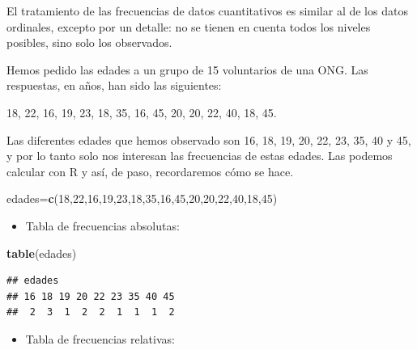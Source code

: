 \documentclass[]{book}
\newenvironment{Shaded}{\begin{snugshade}}{\end{snugshade}}
\newcommand{\DecValTok}[1]{\textcolor[rgb]{0.00,0.00,0.81}{#1}}
\newcommand{\KeywordTok}[1]{\textcolor[rgb]{0.13,0.29,0.53}{\textbf{#1}}}
\newcommand{\NormalTok}[1]{#1}
\providecommand{\tightlist}{%
  \setlength{\itemsep}{0pt}\setlength{\parskip}{0pt}}
\theoremstyle{definition}
\theoremstyle{definition}
\theoremstyle{definition}
\theoremstyle{remark}
\let\BeginKnitrBlock\begin \let\EndKnitrBlock\end
\begin{document}
El tratamiento de las frecuencias de datos cuantitativos es similar al de los datos ordinales, excepto por un detalle: no se tienen en cuenta todos los niveles posibles, sino solo los observados.

\BeginKnitrBlock{example}
\protect\hypertarget{exm:ex181}{}{\label{exm:ex181} }Hemos pedido las edades a un grupo de 15 voluntarios de una ONG. Las respuestas, en años, han sido las siguientes:
\EndKnitrBlock{example}

18, 22, 16, 19, 23, 18, 35, 16, 45, 20, 20, 22, 40, 18, 45.

Las diferentes edades que hemos observado son 16, 18, 19, 20, 22, 23, 35, 40 y 45, y por lo tanto solo nos interesan las frecuencias de estas edades. Las podemos calcular con R y así, de paso, recordaremos cómo se hace.

\begin{Shaded}
\begin{Highlighting}[]
\NormalTok{edades=}\KeywordTok{c}\NormalTok{(}\DecValTok{18}\NormalTok{,}\DecValTok{22}\NormalTok{,}\DecValTok{16}\NormalTok{,}\DecValTok{19}\NormalTok{,}\DecValTok{23}\NormalTok{,}\DecValTok{18}\NormalTok{,}\DecValTok{35}\NormalTok{,}\DecValTok{16}\NormalTok{,}\DecValTok{45}\NormalTok{,}\DecValTok{20}\NormalTok{,}\DecValTok{20}\NormalTok{,}\DecValTok{22}\NormalTok{,}\DecValTok{40}\NormalTok{,}\DecValTok{18}\NormalTok{,}\DecValTok{45}\NormalTok{)}
\end{Highlighting}
\end{Shaded}

\begin{itemize}
\tightlist
\item
  Tabla de frecuencias absolutas:
\end{itemize}

\begin{Shaded}
\begin{Highlighting}[]
\KeywordTok{table}\NormalTok{(edades)    }
\end{Highlighting}
\end{Shaded}

\begin{verbatim}
## edades
## 16 18 19 20 22 23 35 40 45 
##  2  3  1  2  2  1  1  1  2
\end{verbatim}

\begin{itemize}
\tightlist
\item
  Tabla de frecuencias relativas:
\end{itemize}
\end{document}
